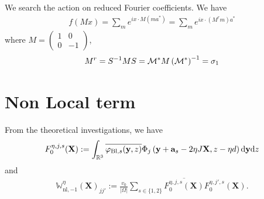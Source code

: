 \documentclass[11pt,a4paper,reqno,french,tikz]{amsart}
\def\d{{\rm d}}
\newcommand{\pa}[1]{\left( #1 \right)} %
\newcommand{\ab}[1]{\left|#1\right|} %
\newcommand\vp{\varphi} %
\newcommand{\f}[2]{\frac{#1}{#2}} %
\newcommand{\mat}[1]{\begin{pmatrix} #1 \end{pmatrix}} %
\def\bX{{\mathbf X}}
\def\ba{{\mathbf a}}
\def\by{{\mathbf y}}
\def\bbW{{\mathbb W}}
\begin{document}
We search the action on reduced Fourier coefficients. We have
\begin{align*}
f(M x) = \sum_m e^{i x \cdot M\pa{m a^*}} = \sum_m e^{i x \cdot \pa{M^r m}a^*}
\end{align*}
where $M = \mat{1 & 0 \\ 0 & -1}$,
\begin{align*}
M^r = S^{-1} M S = \cM^* M \pa{\cM^*}^{-1} = \sigma_1
\end{align*}


\section{Non Local term}%
\label{sec:non_local_term}

From the theoretical investigations, we have
\begin{align*}
F_0^{\eta,j,s}(\bX) := \int_{\R^3} \overline{\vp_{\text{Bl},s}(\by,z)} \Phi_j\pa{\by +\ba_s -2\eta J \bX,z-\eta d} \d \by \d z
\end{align*}
and
\begin{align*}
\bbW_{\text{nl},-1}^\eta\pa{\bX}_{jj'} := \f{v_0}{\ab{\Omega}} \sum_{s \in \{1,2\}} \overline{F_0^{\eta,j,s}(\bX)} F_0^{\eta,j',s}(\bX).
\end{align*}
\end{document}
